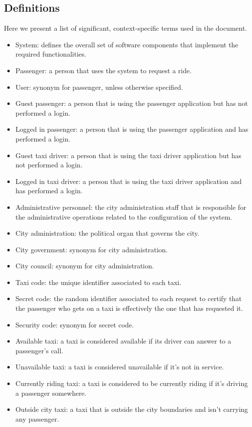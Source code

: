 \subsection{Definitions}
Here we present a list of significant, context-specific terms used in the document.
\begin{itemize}
\item System: defines the overall set of software components that implement the required functionalities.
\item Passenger: a person that uses the system to request a ride.
\item User: synonym for passenger, unless otherwise specified.
\item Guest passenger: a person that is using the passenger application but has not performed a login. 
\item Logged in passenger: a person that is using the passenger application and has performed a login. 
\item Guest taxi driver: a person that is using the taxi driver application but has not performed a login. 
\item Logged in taxi driver: a person that is using the taxi driver application and has performed a login. 
\item Administrative personnel: the city administration staff that is responsible for the administrative operations related to the configuration of the system.
\item City administration: the political organ that governs the city.
\item City government: synonym for city administration.
\item City council:  synonym for city administration.
\item Taxi code: the unique identifier associated to each taxi.
\item Secret code: the random identifier associated to each request to certify that the passenger who gets on a taxi is effectively the one that has requested it.
\item Security code: synonym for secret code.
\item Available taxi: a taxi is considered available if its driver can answer to a passenger's call.
\item Unavailable taxi:  a taxi is considered unavailable if it's not in service.
\item Currently riding taxi: a taxi is considered to be currently riding if it's driving a passenger somewhere. 
\item Outside city taxi: a taxi that is outside the city boundaries and isn't carrying any passenger.

\end{itemize}
